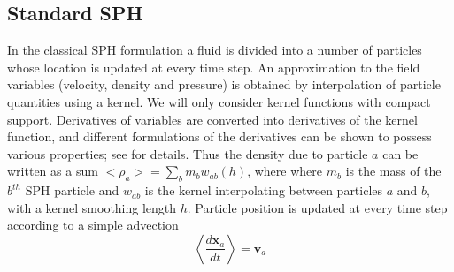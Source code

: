 \documentclass[review]{elsarticle}
\begin{document}
\subsection{Standard SPH}
In the classical SPH formulation a fluid is divided into   a number of particles whose 
location is updated at every time step. An approximation to the field variables (velocity, density and pressure) is obtained by interpolation of particle quantities using  a kernel.
We will only consider kernel functions with  compact support. Derivatives of variables are 
converted into derivatives of the kernel function, and different formulations of the
derivatives can be shown to possess various properties; see 
 \citep{monaghan1992smoothed,monaghan2005smoothed,liu2010smoothed, price2012smoothed} for details.
 Thus the density due to particle $a$ can be written as a sum
 $<\rho_a> = \sum_b m_b w_{ab} \left(h\right) \label{eq:ns-sph-d}$, where 
 where $m_b$ is the  mass of the $b^{th}$ SPH particle and $w_{ab}$ is 
 the kernel interpolating between 
 particles $a$ and $b$, with a kernel smoothing length $h$. 
 Particle position is updated at every time step according to  a simple advection
\begin{equation}
\left\langle\dfrac{d \textbf{x}_a}{dt}\right\rangle = \textbf{v}_a \label{eq:SPH-update-pos}
\end{equation}
\end{document}
